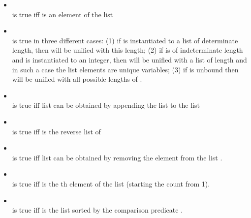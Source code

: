\begin{itemize}
%
\item {}\\
\noindent{} is true iff  is an
element of the list
\\
%
\item {}\\
\noindent{} is true in three
different cases: (1) if  is instantiated to a list of
determinate length, then  will be unified with this
length; (2) if  is of indeterminate length and 
is instantiated to an integer, then  will be unified with a
list of length  and in such a case the list elements are
unique variables; (3) if  is unbound then 
will be unified with all possible lengths of .\\
%
\item {}\\
\noindent{} is true iff  list
can be obtained by appending the  list to the 
list \\
%
\item {}\\
\noindent{} is true iff
 is the reverse list of \\
%
\item {}\\
\noindent{} is true iff
 list can be obtained by removing the element
 from the list .\\
%
\item {}\\
\noindent{} is true iff
 is the th element of the list 
(starting the count from 1).\\
%
\item {}\\
\noindent{} is
true iff  is the list  sorted by the comparison
predicate .\\
%
\end{itemize}

